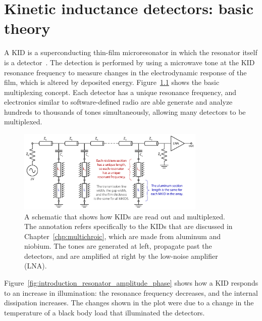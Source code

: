 \chapter{Kinetic inductance detectors: basic theory}
\label{chp:theory}

A KID is a superconducting thin-film microresonator in which the resonator itself is a detector~\autocite{Day2003Nature}.
The detection is performed by using a microwave tone at the KID resonance frequency to measure changes in the electrodynamic response of the film, which is altered by deposited energy.
Figure~\ref{fig:multiplexed_mkids_v1} shows the basic multiplexing concept.
Each detector has a unique resonance frequency, and electronics similar to software-defined radio are able generate and analyze hundreds to thousands of tones simultaneously, allowing many detectors to be multiplexed.

\begin{figure}[htb]
\centering
\includegraphics[width=0.8\textwidth]{theory/multiplexed_mkids_v1.pdf}
\caption[A schematic that shows how KIDs are read out and multiplexed.]
{
A schematic that shows how KIDs are read out and multiplexed.
The annotation refers specifically to the KIDs that are discussed in Chapter~\ref{chp:multichroic}, which are made from aluminum and niobium.
The tones are generated at left, propagate past the detectors, and are amplified at right by the low-noise amplifier (LNA).
}
\label{fig:multiplexed_mkids_v1}
\end{figure}

Figure~\ref{fig:introduction_resonator_amplitude_phase} shows how a KID responds to an increase in illumination: the resonance frequency decreases, and the internal dissipation increases.
The changes shown in the plot were due to a change in the temperature of a black body load that illuminated the detectors.


